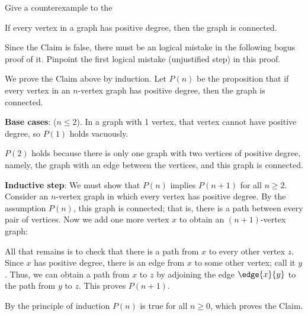 \begin{notesproblem}\label{buildup}
\bparts

\ppart Give a counterexample to the
\begin{falseclm*}
If every vertex in a graph has positive degree, then the graph is
connected.
\end{falseclm*}


\ppart Since the Claim is false, there must be an logical mistake in the
following bogus proof of it.  Pinpoint the first logical mistake
(unjustified step) in this proof.

\begin{bogusproof}
  We prove the Claim above by induction.  Let $P(n)$ be the proposition
  that if every vertex in an $n$-vertex graph has positive degree, then
  the graph is connected.

\textbf{Base cases}: ($n \leq 2$).  In a graph with 1 vertex, that vertex
cannot have positive degree, so $P(1)$ holds vacuously.

$P(2)$ holds because there is only one graph with two vertices of positive
degree, namely, the graph with an edge between the vertices, and this
graph is connected.

\textbf{Inductive step}: We must show that $P(n)$ implies
$P(n+1)$ for all $n \geq 2$.  Consider an $n$-vertex graph in which every
vertex has positive degree.  By the assumption $P(n)$, this graph is
connected; that is, there is a path between every pair of vertices.  Now
we add one more vertex $x$ to obtain an $(n+1)$-vertex graph:


All that remains is to check that there is a path from $x$ to every other
vertex $z$.  Since $x$ has positive degree, there is an edge from $x$ to
some other vertex; call it $y$.  Thus, we can obtain a path from $x$ to
$z$ by adjoining the edge $\edge{x}{y}$ to the path from $y$ to $z$.  This
proves $P(n+1)$.

By the principle of induction $P(n)$ is true for all $n \geq 0$, which
proves the Claim.

\end{bogusproof}

\end{notesproblem}
